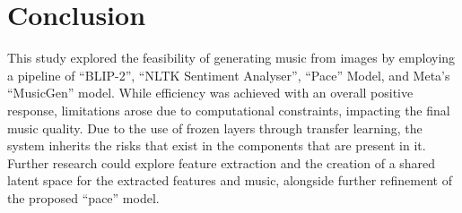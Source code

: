 \documentclass[conference]{IEEEtran}
\begin{document}
\section*{Conclusion}

This study explored the feasibility of generating music from images by employing a pipeline of ``BLIP-2'', ``NLTK Sentiment Analyser'', ``Pace'' Model, and Meta's ``MusicGen'' model. While efficiency was achieved with an overall positive response, limitations arose due to computational constraints, impacting the final music quality. Due to the use of frozen layers through transfer learning, the system inherits the risks that exist in the components that are present in it.
Further research could explore feature extraction and the creation of a shared latent space for the extracted features and music, alongside further refinement of the proposed ``pace'' model.

\nocite{kreuk2022audiogen}
\nocite{wu2008study}
\nocite{gajarla2015emotion}
\nocite{donahue2018adversarial}



\end{document}
